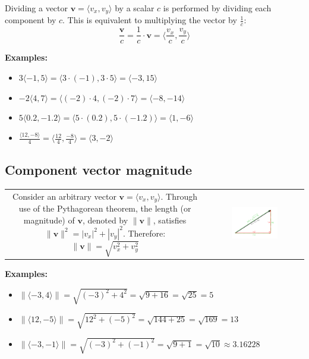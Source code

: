 \documentclass{article}
\begin{document}
Dividing a vector \(\mathbf{v} = \langle v_x, v_y \rangle\) by a scalar \(c\) is performed by dividing each component by \(c\). This is equivalent to multiplying the vector by \(\frac{1}{c}\):
\[\frac{\mathbf{v}}{c} = \frac{1}{c} \cdot \mathbf{v} = \langle \frac{v_x}{c}, \frac{v_y}{c} \rangle\]

\textbf{Examples:}
\begin{itemize}
\item \(3\langle -1, 5 \rangle = \langle 3 \cdot (-1), 3 \cdot 5 \rangle = \langle -3, 15 \rangle\)
\item \(-2\langle 4, 7 \rangle = \langle (-2) \cdot 4, (-2) \cdot 7 \rangle = \langle -8, -14 \rangle\)
\item \(5\langle 0.2, -1.2 \rangle = \langle 5 \cdot (0.2), 5 \cdot (-1.2) \rangle = \langle 1, -6 \rangle\)
\item \(\frac{\langle 12, -8 \rangle}{4} = \langle \frac{12}{4} , \frac{-8}{4} \rangle = \langle 3, -2 \rangle\)
\end{itemize}


\subsection*{Component vector magnitude}

\begin{tabular}{cc}
\parbox{0.5\textwidth}{
Consider an arbitrary vector \(\mathbf{v} = \langle v_x, v_y \rangle\). Through use of the Pythagorean theorem, the length (or magnitude) of \(\mathbf{v}\), denoted by \(\|\mathbf{v}\|\), satisfies \(\|\mathbf{v}\|^2 = |v_x|^2 + |v_y|^2\). Therefore:
\[\|\mathbf{v}\| = \sqrt{v_x^2 + v_y^2}\]
} & \parbox{0.5\textwidth}{
\includegraphics[width = 0.5\textwidth]{component_vector_magnitude}
}
\end{tabular}

\textbf{Examples:}
\begin{itemize}
\item \(\|\langle -3, 4 \rangle\| = \sqrt{(-3)^2 + 4^2} = \sqrt{9 + 16} = \sqrt{25} = 5\)
\item \(\|\langle 12, -5 \rangle\| = \sqrt{12^2 + (-5)^2} = \sqrt{144 + 25} = \sqrt{169} = 13\)
\item \(\|\langle -3, -1 \rangle\| = \sqrt{(-3)^2 + (-1)^2} = \sqrt{9 + 1} = \sqrt{10} \approx 3.16228\)
\end{itemize}
\end{document}
